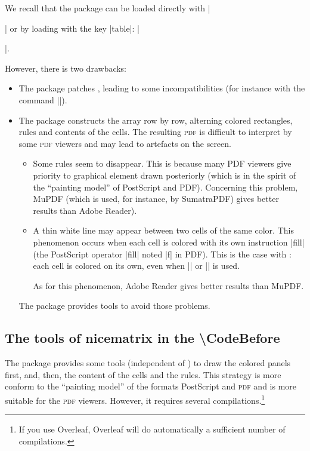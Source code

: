 \documentclass[dvipsnames]{article}%
\begin{document}

We recall that the package  can be loaded directly with
|\usepackage{colortbl}| or by loading  with the key |table|:
|\usepackage[table]{xcolor}|. 

\medskip
However, there is two drawbacks:
\begin{itemize}
\item The package  patches , leading to some
incompatibilities (for instance with the command |\hdotsfor|).

\item The package  constructs the array row by row, alterning
colored rectangles, rules and contents of the cells. The resulting
\textsc{pdf} is difficult to interpret by some \textsc{pdf} viewers and may
lead to artefacts on the screen.
\begin{itemize}
\item Some rules seem to disappear. This is because many PDF viewers give
priority to graphical element drawn posteriorly (which is in the spirit of the
``painting model'' of PostScript and PDF). Concerning this problem, MuPDF
(which is used, for instance, by SumatraPDF) gives better results than Adobe
Reader).
\item A thin white line may appear between two cells of the same color. This
phenomenon occurs when each cell is colored with its own instruction |fill|
(the PostScript operator |fill| noted |f| in PDF). This is the case with
: each cell is colored on its own, even when |\columncolor| or
|\rowcolor| is used.

As for this phenomenon, Adobe Reader gives better results than MuPDF.
\end{itemize}

The package  provides tools to avoid those problems.
\end{itemize}

\subsection{The tools of nicematrix in the \textbackslash CodeBefore}

\label{color-in-code-before}

The package  provides some tools (independent of )
to draw the colored panels first, and, then, the content of the cells and the
rules. This strategy is more conform to the ``painting model'' of the formats
PostScript and \textsc{pdf} and is more suitable for the \textsc{pdf} viewers.
However, it requires several compilations.\footnote{If you use Overleaf,
  Overleaf will do automatically a sufficient number of compilations.}
\end{document}
